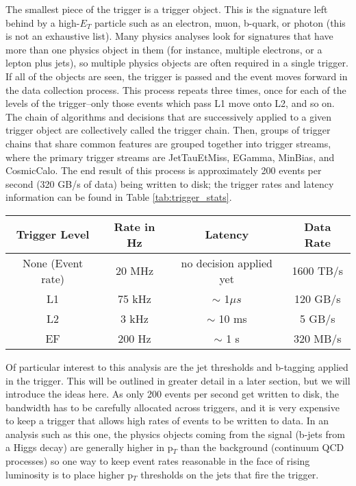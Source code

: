 The smallest piece of the trigger is a trigger object.  This is the signature left behind by a high-$E_T$ particle such as an electron, muon, b-quark, or photon (this is not an exhaustive list).  Many physics analyses look for signatures that have more than one physics object in them (for instance, multiple electrons, or a lepton plus jets), so multiple physics objects are often required in a single trigger.  If all of the objects are seen, the trigger is passed and the event moves forward in the data collection process.  This process repeats three times, once for each of the levels of the trigger--only those events which pass L1 move onto L2, and so on.   The chain of algorithms and decisions that are successively applied to a given trigger object are collectively called the trigger chain.  Then, groups of trigger chains that share common features are grouped together into trigger streams, where the primary trigger streams are JetTauEtMiss, EGamma, MinBias, and CosmicCalo.  The end result of this process is approximately 200 events per second (320 GB/s of data) being written to disk; the trigger rates and latency information can be found in Table \ref{tab:trigger_stats}.

  

\begin{table}
\begin{tabular}{c | c | c | c}
Trigger Level & Rate in Hz  & Latency  & Data Rate\\  \hline
None (Event rate) & 20 MHz  & no decision applied yet & 1600 TB/s \\
L1  & 75 kHz  &  $\sim$ 1$\mu s$  & 120 GB/s\\
L2  & 3 kHz    & $\sim$ 10 ms & 5 GB/s \\
EF  &  200 Hz  & $\sim$ 1 s & 320 MB/s \\
\end{tabular}
\end{table}
\label{tab:trigger_stats}


Of particular interest to this analysis are the jet thresholds and b-tagging applied in the trigger.  This will be outlined in greater detail in a later section, but we will introduce the ideas here.  As only 200 events per second get written to disk, the bandwidth has to be carefully allocated across triggers, and it is very expensive to keep a trigger that allows high rates of events to be written to data.  In an analysis such as this one, the physics objects coming from the signal (b-jets from a Higgs decay) are generally higher in p$_T$ than the background (continuum QCD processes) so one way to keep event rates reasonable in the face of rising luminosity is to place higher p$_T$ thresholds on the jets that fire the trigger.   

